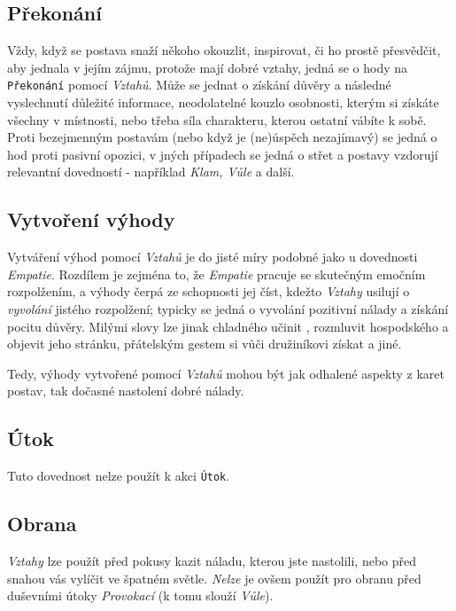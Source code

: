 \documentclass[../main.tex]{subfiles}
\begin{document}
\subsection*{Překonání}
\label{subsec:vztahy-prekonani}
\prekonani

Vždy, když se postava snaží někoho okouzlit, inspirovat, či ho prostě přesvědčit, aby jednala v jejím zájmu, protože mají dobré vztahy, jedná se o hody na \texttt{Překonání} pomocí \textit{Vztahů}. Může se jednat o získání důvěry a následné vyslechnutí důležité informace, neodolatelné kouzlo osobnosti, kterým si získáte všechny v místnosti, nebo třeba síla charakteru, kterou ostatní vábíte k sobě. Proti bezejmenným postavám (nebo když je (ne)úspěch nezajímavý) se jedná o hod proti pasivní opozici, v jných případech se jedná o střet a postavy vzdorují relevantní dovedností - například \textit{Klam, Vůle} a další.

\subsection*{Vytvoření výhody}
\label{subsec:vztahy-vytvoreni}
\vytvoreni

Vytváření výhod pomocí \textit{Vztahů} je do jisté míry podobné jako u dovednosti \textit{Empatie}. Rozdílem je zejména to, že \textit{Empatie} pracuje se skutečným emočním rozpolžením, a výhody čerpá ze schopnosti jej číst, kdežto \textit{Vztahy} usilují o \textit{vyvolání} jistého rozpolžení; typicky se jedná o vyvolání pozitivní nálady a získání pocitu důvěry. Milými slovy lze jinak chladného učinit , rozmluvit hospodského a objevit jeho  stránku, přátelským gestem si vůči družiníkovi získat  a jiné.

Tedy, výhody vytvořené pomocí \textit{Vztahů} mohou být jak odhalené aspekty z karet postav, tak dočasné nastolení dobré nálady.

\subsection*{Útok}
\label{subsec:vztahy-utok}
\utok

Tuto dovednost nelze použít k akci \texttt{Útok}.

\subsection*{Obrana}
\label{subsec:vztahy-obrana}
\obrana

\textit{Vztahy} lze použít před pokusy kazit náladu, kterou jste nastolili, nebo před snahou vás vylíčit ve špatném světle. \textit{Nelze} je ovšem použít pro obranu před duševními útoky \textit{Provokací} (k tomu slouží \textit{Vůle}).
\end{document}
